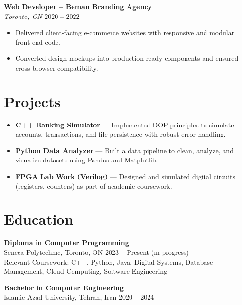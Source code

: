 \documentclass[letterpaper,10pt]{article}
\begin{document}
\textbf{Web Developer – Beman Branding Agency}\\
\textit{Toronto, ON} \hfill 2020 -- 2022
\begin{itemize}[leftmargin=*]
  \item Delivered client-facing e-commerce websites with responsive and modular front-end code.
  \item Converted design mockups into production-ready components and ensured cross-browser compatibility.
\end{itemize}

\section*{Projects}
\begin{itemize}[leftmargin=*]
  \item \textbf{C++ Banking Simulator} — Implemented OOP principles to simulate accounts, transactions, and file persistence with robust error handling.
  \item \textbf{Python Data Analyzer} — Built a data pipeline to clean, analyze, and visualize datasets using Pandas and Matplotlib.
  \item \textbf{FPGA Lab Work (Verilog)} — Designed and simulated digital circuits (registers, counters) as part of academic coursework.
\end{itemize}

\section*{Education}
\textbf{Diploma in Computer Programming} \\ Seneca Polytechnic, Toronto, ON \hfill 2023 -- Present (in progress) \\
Relevant Coursework: C++, Python, Java, Digital Systems, Database Management, Cloud Computing, Software Engineering

\textbf{Bachelor in Computer Engineering} \\ Islamic Azad University, Tehran, Iran \hfill 2020 -- 2024
\end{document}
